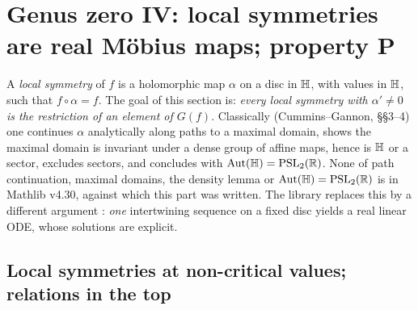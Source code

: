 \section{Genus zero IV: local symmetries are real M\"obius maps; property P}\label{ch19:sec:local}

A \emph{local symmetry} of $f$ is a holomorphic map $\alpha$ on a disc in $\mathbb{H}$, with values in $\mathbb{H}$, such that
$f\circ\alpha=f$.  The goal of this section is: \emph{every local symmetry with $\alpha'\ne0$ is the restriction of an element of
$G(f)$}.  Classically (Cummins--Gannon, \S\S3--4) one continues $\alpha$ analytically along paths to a maximal domain, shows the
maximal domain is invariant under a dense group of affine maps, hence is $\mathbb{H}$ or a sector, excludes sectors, and
concludes with $\operatorname{Aut}(\mathbb{H})=\mathrm{PSL}_2(\mathbb{R})$.  None of path continuation, maximal domains, the density lemma or
$\operatorname{Aut}(\mathbb{H})=\mathrm{PSL}_2(\mathbb{R})$ is in Mathlib v4.30, against which this part was written.  The library replaces this by a different argument
: \emph{one} intertwining sequence on a fixed disc yields a real linear ODE, whose solutions are
explicit.

\subsection{Local symmetries at non-critical values; relations in the top}

